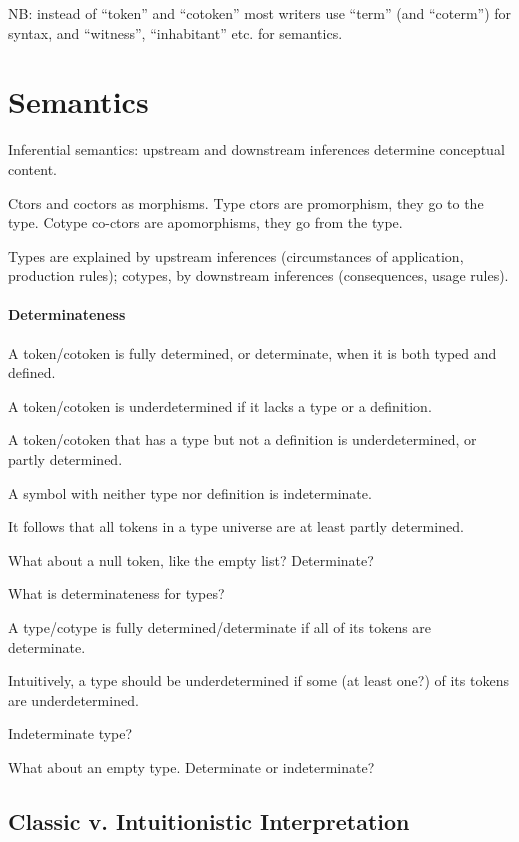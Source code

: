 NB: instead of ``token'' and ``cotoken'' most writers use ``term''
(and ``coterm'') for syntax, and ``witness'', ``inhabitant'' etc. for
semantics.

\section{Semantics}

Inferential semantics: upstream and downstream inferences determine
conceptual content.

Ctors and coctors as morphisms. Type ctors are promorphism, they go to
the type. Cotype co-ctors are apomorphisms, they go from the type.

Types are explained by upstream inferences (circumstances of
application, production rules); cotypes, by downstream inferences
(consequences, usage rules).

\paragraph{Determinateness}

A token/cotoken is fully determined, or determinate, when it is both typed and defined.

A token/cotoken is underdetermined if it lacks a type or a definition.

A token/cotoken that has a type but not a definition is
underdetermined, or partly determined.

A symbol with neither type nor definition is indeterminate.

It follows that all tokens in a type universe are at least partly
determined.

What about a null token, like the empty list? Determinate?

What is determinateness for types?

A type/cotype is fully determined/determinate if all of its tokens are
determinate.

Intuitively, a type should be underdetermined if some (at least one?)
of its tokens are underdetermined.

Indeterminate type?

What about an empty type. Determinate or indeterminate?

\subsection{Classic v. Intuitionistic Interpretation}

